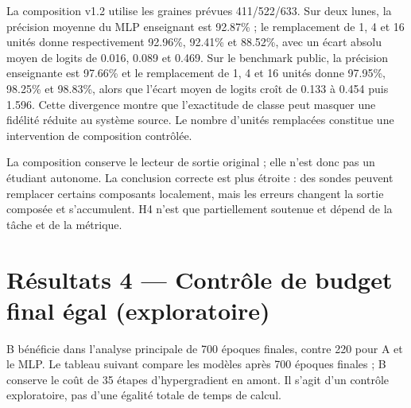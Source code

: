 \documentclass[11pt,a4paper]{article}
\begin{document}
La composition v1.2 utilise les graines prévues 411/522/633. Sur deux lunes, la précision moyenne du MLP enseignant est 92.87\% ; le remplacement de 1, 4 et 16 unités donne respectivement 92.96\%, 92.41\% et 88.52\%, avec un écart absolu moyen de logits de 0.016, 0.089 et 0.469. Sur le benchmark public, la précision enseignante est 97.66\% et le remplacement de 1, 4 et 16 unités donne 97.95\%, 98.25\% et 98.83\%, alors que l'écart moyen de logits croît de 0.133 à 0.454 puis 1.596. Cette divergence montre que l'exactitude de classe peut masquer une fidélité réduite au système source. Le nombre d'unités remplacées constitue une intervention de composition contrôlée.

La composition conserve le lecteur de sortie original ; elle n'est donc pas un étudiant autonome. La conclusion correcte est plus étroite : des sondes peuvent remplacer certains composants localement, mais les erreurs changent la sortie composée et s'accumulent. H4 n'est que partiellement soutenue et dépend de la tâche et de la métrique.

\section{Résultats 4 — Contrôle de budget final égal (exploratoire)}
B bénéficie dans l'analyse principale de 700 époques finales, contre 220 pour A et le MLP. Le tableau suivant compare les modèles après 700 époques finales ; B conserve le coût de 35 étapes d'hypergradient en amont. Il s'agit d'un contrôle exploratoire, pas d'une égalité totale de temps de calcul.
\end{document}
